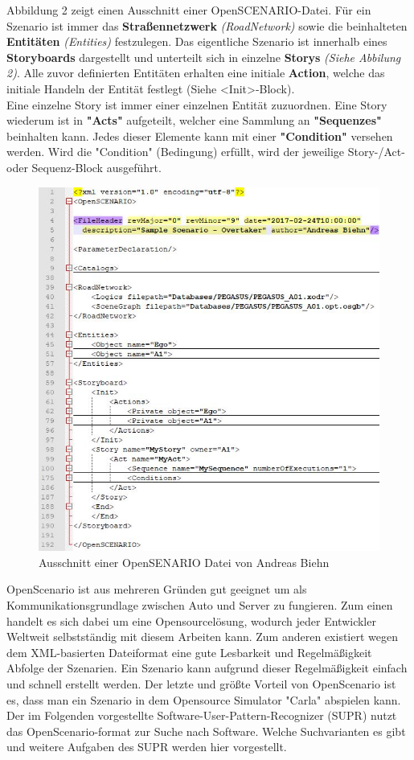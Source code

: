 Abbildung 2 zeigt einen Ausschnitt einer OpenSCENARIO-Datei. Für ein Szenario ist immer das \textbf{Straßennetzwerk}\textit{ (RoadNetwork) }sowie die beinhalteten \textbf{Entitäten }\textit{(Entities)} festzulegen. Das eigentliche Szenario ist innerhalb eines \textbf{Storyboards }dargestellt und unterteilt sich in einzelne \textbf{Storys }\textit{(Siehe Abbilung 2)}. Alle zuvor definierten Entitäten erhalten eine initiale \textbf{Action}, welche das initiale Handeln der Entität festlegt (Siehe <Init>-Block).\\
Eine einzelne Story ist immer einer einzelnen Entität zuzuordnen. Eine Story wiederum ist in \textbf{"Acts"} aufgeteilt, welcher eine Sammlung an \textbf{"Sequenzes"} beinhalten kann. Jedes dieser Elemente kann mit einer \textbf{"Condition"} versehen werden. Wird die "Condition" (Bedingung) erfüllt, wird der jeweilige Story-/Act- oder Sequenz-Block ausgeführt.
\begin{figure}[H]
	\includegraphics[width=\textwidth]{../pictures/openscenario.jpg}
	\caption{Ausschnitt einer OpenSENARIO Datei von Andreas Biehn\cite{b35}}
\end{figure}
OpenScenario ist aus mehreren Gründen gut geeignet um als Kommunikationsgrundlage zwischen Auto und Server zu fungieren. Zum einen handelt es sich dabei um eine Opensourcelösung, wodurch jeder Entwickler Weltweit selbstständig mit diesem Arbeiten kann. Zum anderen existiert wegen dem XML-basierten Dateiformat eine gute Lesbarkeit und Regelmäßigkeit Abfolge der Szenarien. Ein Szenario kann aufgrund dieser Regelmäßigkeit einfach und schnell erstellt werden. Der letzte und größte Vorteil von OpenScenario ist es, dass man ein Szenario in dem Opensource Simulator "Carla" abspielen kann.\\
Der im Folgenden vorgestellte Software-User-Pattern-Recognizer (SUPR) nutzt das OpenScenario-format zur Suche nach Software. Welche Suchvarianten es gibt und weitere Aufgaben des SUPR werden hier vorgestellt.

